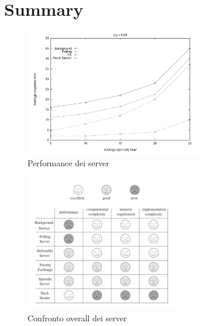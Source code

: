 \documentclass[12pt,openany,onesided]{book}
\begin{document}
\section{Summary}
\begin{figure}[H]
    \centering
    \includegraphics[width=0.7\textwidth]{pictures/performanceComparison.png}
    \caption{Performance dei server}
    \label{fig:performanceComparison}
\end{figure}
\begin{figure}[H]
    \centering
    \includegraphics[width=0.6\textwidth]{pictures/comparisonServer.png}
    \caption{Confronto overall dei server}
    \label{fig:comparisonServer}
\end{figure}
\end{document}

